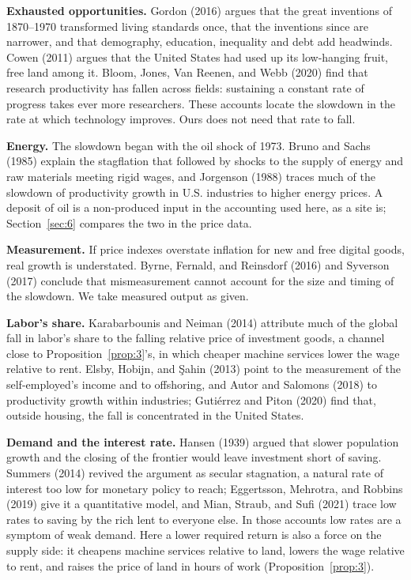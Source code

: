 \documentclass[12pt]{article}
\theoremstyle{plain}
\begin{document}
\textbf{Exhausted opportunities.} Gordon (2016) argues that the great inventions of 1870--1970 transformed living standards once, that the inventions since are narrower, and that demography, education, inequality and debt add headwinds. Cowen (2011) argues that the United States had used up its low-hanging fruit, free land among it. Bloom, Jones, Van Reenen, and Webb (2020) find that research productivity has fallen across fields: sustaining a constant rate of progress takes ever more researchers. These accounts locate the slowdown in the rate at which technology improves. Ours does not need that rate to fall.

\textbf{Energy.} The slowdown began with the oil shock of 1973. Bruno and Sachs (1985) explain the stagflation that followed by shocks to the supply of energy and raw materials meeting rigid wages, and Jorgenson (1988) traces much of the slowdown of productivity growth in U.S. industries to higher energy prices. A deposit of oil is a non-produced input in the accounting used here, as a site is; Section~\ref{sec:6} compares the two in the price data.

\textbf{Measurement.} If price indexes overstate inflation for new and free digital goods, real growth is understated. Byrne, Fernald, and Reinsdorf (2016) and Syverson (2017) conclude that mismeasurement cannot account for the size and timing of the slowdown. We take measured output as given.

\textbf{Labor's share.} Karabarbounis and Neiman (2014) attribute much of the global fall in labor's share to the falling relative price of investment goods, a channel close to Proposition~\ref{prop:3}'s, in which cheaper machine services lower the wage relative to rent. Elsby, Hobijn, and \c{S}ahin (2013) point to the measurement of the self-employed's income and to offshoring, and Autor and Salomons (2018) to productivity growth within industries; Gutiérrez and Piton (2020) find that, outside housing, the fall is concentrated in the United States.

\textbf{Demand and the interest rate.} Hansen (1939) argued that slower population growth and the closing of the frontier would leave investment short of saving. Summers (2014) revived the argument as secular stagnation, a natural rate of interest too low for monetary policy to reach; Eggertsson, Mehrotra, and Robbins (2019) give it a quantitative model, and Mian, Straub, and Sufi (2021) trace low rates to saving by the rich lent to everyone else. In those accounts low rates are a symptom of weak demand. Here a lower required return is also a force on the supply side: it cheapens machine services relative to land, lowers the wage relative to rent, and raises the price of land in hours of work (Proposition~\ref{prop:3}).
\end{document}
